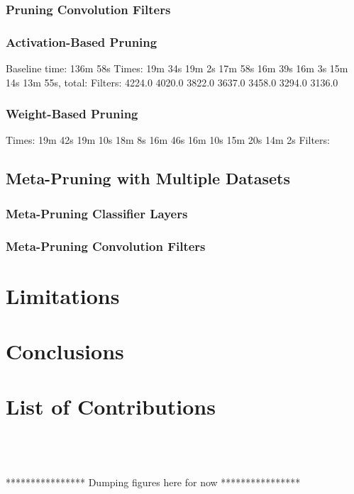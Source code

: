 \documentclass{article}
\begin{document}
\subsubsection{Pruning Convolution Filters}

\subsubsection{Activation-Based Pruning}


Baseline time: 136m 58s
Times: 19m 34s   19m 2s   17m 58s   16m 39s   16m 3s   15m 14s   13m 55s, total: 
Filters: 4224.0   4020.0   3822.0   3637.0   3458.0   3294.0   3136.0
\subsubsection{Weight-Based Pruning}
Times: 19m 42s   19m 10s   18m 8s   16m 46s   16m 10s   15m 20s  14m 2s
Filters: 

\subsection{Meta-Pruning with Multiple Datasets}

\subsubsection{Meta-Pruning Classifier Layers}


\subsubsection{Meta-Pruning Convolution Filters}


\section{Limitations}


\section{Conclusions}


\section{List of Contributions}


\ \\ 
\ \\
\ \\
**************** Dumping figures here for now ****************
\end{document}
